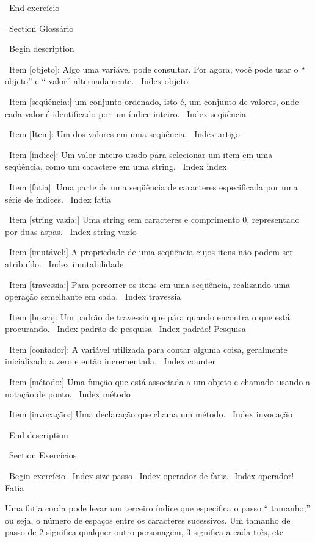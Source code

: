 \documentclass[10pt]{book}
\begin{document}
\begin {itemize}
{{{{{{\ End {} exercício



\ Section {} Glossário

\ Begin {description}

\ Item [objeto]: Algo uma variável pode consultar. Por agora,
você pode usar o `` objeto'' e `` valor'' alternadamente.
\ Index {objeto}

\ Item [seqüência:] um conjunto ordenado, isto é, um conjunto de
valores, onde cada valor é identificado por um índice inteiro.
\ Index {seqüência}

\ Item [Item]: Um dos valores em uma seqüência.
\ Index {artigo}

\ Item [índice]: Um valor inteiro usado para selecionar um item em
uma seqüência, como um caractere em uma string.
\ Index {index}

\ Item [fatia]: Uma parte de uma seqüência de caracteres especificada por uma série de índices.
\ Index {fatia}

\ Item [string vazia:] Uma string sem caracteres e comprimento 0, representado
por duas aspas.
\ Index {string vazio}

\ Item [imutável:] A propriedade de uma seqüência cujos itens não podem
ser atribuído.
\ Index {imutabilidade}

\ Item [travessia:] Para percorrer os itens em uma seqüência,
realizando uma operação semelhante em cada.
\ Index {travessia}

\ Item [busca]: Um padrão de travessia que pára
quando encontra o que está procurando.
\ Index {padrão de pesquisa}
\ Index {padrão! Pesquisa}

\ Item [contador]: A variável utilizada para contar alguma coisa, geralmente inicializado
a zero e então incrementada.
\ Index {counter}

\ Item [método:] Uma função que está associada a um objeto e chamado
usando a notação de ponto.
\ Index {método}

\ Item [invocação:] Uma declaração que chama um método.
\ Index {} invocação

\ End {description}


\ Section {Exercícios}

\ Begin {} exercício
\ Index {size passo}
\ Index {operador de fatia}
\ Index {operador! Fatia}

Uma fatia corda pode levar um terceiro índice que especifica o passo ``
tamanho,'' ou seja, o número de espaços entre os caracteres sucessivos.
Um tamanho de passo de 2 significa qualquer outro personagem, 3 significa a cada três,
etc

}}}}}}
\end{itemize}
\end{document}
